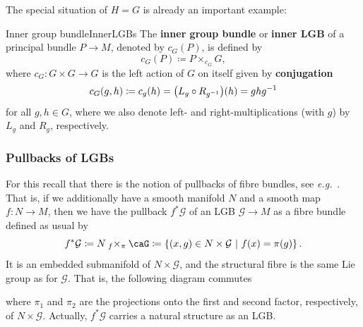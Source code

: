 \documentclass[reqno,a4paper,oneside]{amsart}
\newcommand\fibtimes[2]{\mathbin{_{#1}\times_{#2}}}
\theoremstyle{plain}
\theoremstyle{remark}
\theoremstyle{definition}
\begin{document}
The special situation of $H = G$ is already an important example:

\begin{examples}{Inner group bundle}{InnerLGBs}
The \textbf{inner group bundle} or \textbf{inner LGB} of a principal bundle $P \to M$, denoted by $c_G(P)$, is defined by
\begin{equation*}
c_G(P)
\coloneqq
P \times_{c_G} G,
\end{equation*}
where $c_G: G \times G \to G$ is the left action of $G$ on itself given by \textbf{conjugation}
\begin{equation*}
c_G(g,h)
\coloneqq
c_g (h)
=
\mleft(L_g \circ R_{g^{-1}}\mright)(h)
=
ghg^{-1}
\end{equation*}
for all $g, h \in G$, where we also denote left- and right-multiplications (with $g$) by $L_g$ and $R_g$, respectively. 
%
\end{examples}

\subsubsection{Pullbacks of LGBs}

For this recall that there is the notion of pullbacks of fibre bundles, see \textit{e.g.}\ \cite[\S 4.1.4, page 203ff.; especially Thm.\ 4.1.17, page 204f.]{Hamilton}. That is, if we additionally have a smooth manifold $N$ and a smooth map $f\colon N \to M$, then we have the pullback $f^*\mathcal{G}$ of an LGB $\mathcal{G} \to M$ as a fibre bundle defined as usual by
\begin{equation*}
f^*\mathcal{G}
\coloneqq
N \fibtimes{f}{\pi} \caG
\coloneqq
\left\{
	(x, g) \in N \times \mathcal{G} ~\middle|~
	f(x) = \pi(g)
\right\}.
\end{equation*}
It is an embedded submanifold of $N \times \mathcal{G}$, and the structural fibre is the same Lie group as for $\mathcal{G}$.
That is, the following diagram commutes
\begin{center}
\end{center}
where $\pi_1$ and $\pi_2$ are the projections onto the first and second factor, respectively, of $N \times \mathcal{G}$. Actually, $f^*\mathcal{G}$ carries a natural structure as an LGB.
\end{document}

